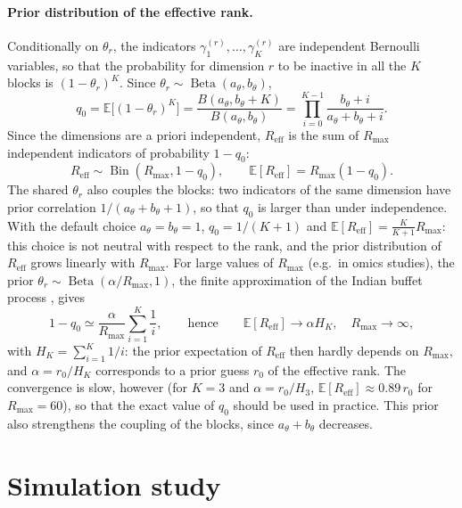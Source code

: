 \documentclass[11pt]{article}
\DeclareMathOperator{\Be}{Beta}
\begin{document}
\paragraph{Prior distribution of the effective rank.} Conditionally on $\theta_r$, the indicators $\gamma_1^{(r)},\ldots,\gamma_K^{(r)}$ are independent Bernoulli variables, so that the probability for dimension $r$ to be inactive in all the $K$ blocks is $(1-\theta_r)^K$. Since $\theta_r\sim \Be(a_\theta,b_\theta)$,
\[
  q_0=\mathbb E\bigl[(1-\theta_r)^K\bigr]=\frac{B(a_\theta,b_\theta+K)}{B(a_\theta,b_\theta)}=\prod_{i=0}^{K-1}\frac{b_\theta+i}{a_\theta+b_\theta+i}.
\]
Since the dimensions are a priori independent, $R_{\mathrm{eff}}$ is the sum of $R_{\max}$ independent indicators of probability $1-q_0$:
\[
  R_{\mathrm{eff}}\sim \operatorname{Bin}(R_{\max},1-q_0), \qquad \mathbb E[R_{\mathrm{eff}}]=R_{\max}(1-q_0).
\]
The shared $\theta_r$ also couples the blocks: two indicators of the same dimension have prior correlation $1/(a_\theta+b_\theta+1)$, so that $q_0$ is larger than under independence. With the default choice $a_\theta=b_\theta=1$, $q_0=1/(K+1)$ and $\mathbb E[R_{\mathrm{eff}}]=\frac{K}{K+1}R_{\max}$: this choice is not neutral with respect to the rank, and the prior distribution of $R_{\mathrm{eff}}$ grows linearly with $R_{\max}$. For large values of $R_{\max}$ (e.g.\ in omics studies), the prior $\theta_r\sim \Be(\alpha/R_{\max},1)$, the finite approximation of the Indian buffet process \citep{griffiths2011}, gives
\[
  1-q_0 \simeq \frac{\alpha}{R_{\max}} \sum_{i=1}^K \frac1{i}, \qquad\text{hence}\qquad \mathbb E[R_{\mathrm{eff}}]\longrightarrow\alpha H_K,\quad R_{\max}\to\infty,
\]
with $H_K=\sum_{i=1}^K1/i$: the prior expectation of $R_{\mathrm{eff}}$ then hardly depends on $R_{\max}$, and $\alpha=r_0/H_K$ corresponds to a prior guess $r_0$ of the effective rank. The convergence is slow, however (for $K=3$ and $\alpha=r_0/H_3$, $\mathbb E[R_{\mathrm{eff}}]\approx0.89\,r_0$ for $R_{\max}=60$), so that the exact value of $q_0$ should be used in practice. This prior also strengthens the coupling of the blocks, since $a_\theta+b_\theta$ decreases.



\section{Simulation study}
\end{document}
